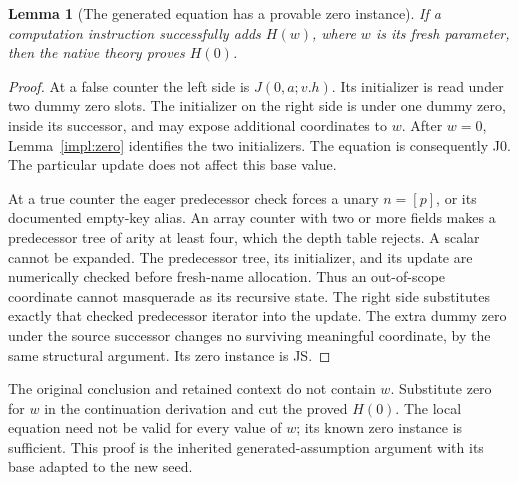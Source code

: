 \documentclass[11pt,letterpaper]{article}
\newtheorem{lemma}[theorem]{Lemma}
\theoremstyle{definition}\newtheorem{definition}[theorem]{Definition}
\theoremstyle{remark}\newtheorem{remark}[theorem]{Remark}
\begin{document}
\begin{lemma}[The generated equation has a provable zero instance]
\label{impl:supply}
If a computation instruction successfully adds $H(w)$, where $w$ is its
fresh parameter, then the native theory proves $H(0)$.
\end{lemma}
\begin{proof}
At a false counter the left side is $J(0,a;v.h)$. Its initializer is
read under two dummy zero slots. The initializer on the right side is
under one dummy zero, inside its successor, and may expose additional
coordinates to $w$. After $w=0$, Lemma~\ref{impl:zero} identifies the
two initializers. The equation is consequently J0. The particular update
does not affect this base value.

At a true counter the eager predecessor check forces a unary $n=[p]$,
or its documented empty-key alias. An array counter with two or more
fields makes a predecessor tree of arity at least four, which the depth
table rejects. A scalar cannot be expanded. The predecessor tree, its
initializer, and its update are numerically checked before fresh-name
allocation. Thus an out-of-scope coordinate cannot masquerade as its
recursive state. The right side substitutes exactly that checked
predecessor iterator into the update. The extra dummy zero under the
source successor changes no surviving meaningful coordinate, by the
same structural argument. Its zero instance is JS.
\end{proof}

The original conclusion and retained context do not contain $w$.
Substitute zero for $w$ in the continuation derivation and cut the
proved $H(0)$. The local equation need not be valid for every value of
$w$; its known zero instance is sufficient. This proof is the inherited
generated-assumption argument with its base adapted to the new seed.
\end{document}
